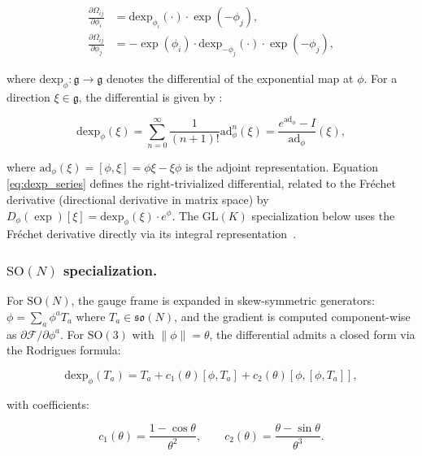 \documentclass[twoside,11pt]{article}
\begin{document}
\begin{align}
\frac{\partial \Omega_{ij}}{\partial \phi_i} &= \mathrm{dexp}_{\phi_i}(\cdot) \cdot \exp(-\phi_j), \label{eq:dOmega_dphi_i} \\
\frac{\partial \Omega_{ij}}{\partial \phi_j} &= -\exp(\phi_i) \cdot \mathrm{dexp}_{-\phi_j}(\cdot) \cdot \exp(-\phi_j), \label{eq:dOmega_dphi_j}
\end{align}

where $\mathrm{dexp}_\phi: \mathfrak{g} \to \mathfrak{g}$ denotes the differential of the exponential map at $\phi$. For a direction $\xi \in \mathfrak{g}$, the differential is given by \citep{Gallier2020,Hall2015}:

\begin{equation}
\mathrm{dexp}_\phi(\xi) = \sum_{n=0}^{\infty} \frac{1}{(n+1)!} \mathrm{ad}_\phi^n(\xi) = \frac{e^{\mathrm{ad}_\phi} - I}{\mathrm{ad}_\phi}(\xi),
\label{eq:dexp_series}
\end{equation}

where $\mathrm{ad}_\phi(\xi) = [\phi, \xi] = \phi\xi - \xi\phi$ is the adjoint representation. Equation \eqref{eq:dexp_series} defines the right-trivialized differential, related to the Fr\'{e}chet derivative (directional derivative in matrix space) by $D_\phi(\exp)[\xi] = \mathrm{dexp}_\phi(\xi) \cdot e^\phi$. The $\mathrm{GL}(K)$ specialization below uses the Fr\'{e}chet derivative directly via its integral representation~\citep[Ch.~10]{Higham2008}.

\subsubsection{$\mathrm{SO}(N)$ specialization.}

For $\mathrm{SO}(N)$, the gauge frame is expanded in skew-symmetric generators: $\phi = \sum_a \phi^a T_a$ where $T_a \in \mathfrak{so}(N)$, and the gradient is computed component-wise as $\partial \mathcal{F}/\partial \phi^a$. For $\mathrm{SO}(3)$ with $\|\phi\| = \theta$, the differential admits a closed form via the Rodrigues formula:

\begin{equation}
\mathrm{dexp}_\phi(T_a) = T_a + c_1(\theta)[\phi, T_a] + c_2(\theta)[\phi, [\phi, T_a]],
\label{eq:dexp_so3}
\end{equation}

with coefficients:

\begin{equation}
c_1(\theta) = \frac{1 - \cos\theta}{\theta^2}, \qquad c_2(\theta) = \frac{\theta - \sin\theta}{\theta^3}.
\end{equation}
\end{document}
